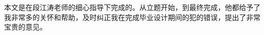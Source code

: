 \begin{thanksfor}
本文是在段江涛老师的细心指导下完成的。从立题开始，到最终完成，他都给予了我非常多的关怀和帮助，及时纠正我在完成毕业设计期间的犯的错误，提出了非常宝贵的意见。
\end{thanksfor}